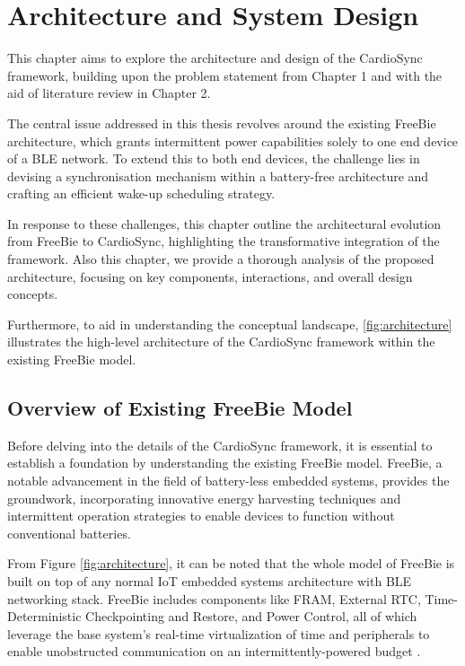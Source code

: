 \chapter{Architecture and System Design}
\label{chap:architecture}

This chapter aims to explore the architecture and design of the CardioSync framework, building upon the problem statement from Chapter 1 and with the aid of literature review in Chapter 2.

\noindent The central issue addressed in this thesis revolves around the existing FreeBie architecture, which grants intermittent power capabilities solely to one end device of a BLE network. To extend this to both end devices, the challenge lies in devising a synchronisation mechanism within a battery-free architecture and crafting an efficient wake-up scheduling strategy.

\noindent In response to these challenges, this chapter outline the architectural evolution from FreeBie to CardioSync, highlighting the transformative integration of the framework. Also this chapter, we provide a thorough analysis of the proposed architecture, focusing on key components, interactions, and overall design concepts.

\noindent Furthermore, to aid in understanding the conceptual landscape, \autoref{fig:architecture} illustrates the high-level architecture of the CardioSync framework within the existing FreeBie model.


\section{Overview of Existing FreeBie Model}
Before delving into the details of the CardioSync framework, it is essential to establish a foundation by understanding the existing FreeBie model. FreeBie, a notable advancement in the field of battery-less embedded systems, provides the groundwork, incorporating innovative energy harvesting techniques and intermittent operation strategies to enable devices to function without conventional batteries.  

\noindent From Figure \ref{fig:architecture}, it can be noted that the whole model of FreeBie is built on top of any normal IoT embedded systems architecture with BLE networking stack. FreeBie includes components like FRAM, External RTC, Time-Deterministic Checkpointing and Restore, and Power Control, all of which leverage the base system's real-time virtualization of time and peripherals to enable unobstructed communication on an intermittently-powered budget \cite{de2022Intermittently}.

